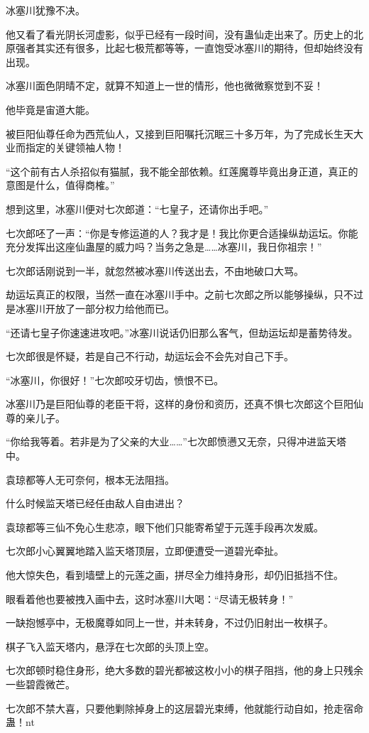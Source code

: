 \begin{this_body}
冰塞川犹豫不决。

他又看了看光阴长河虚影，似乎已经有一段时间，没有蛊仙走出来了。历史上的北原强者其实还有很多，比起七极荒都等等，一直饱受冰塞川的期待，但却始终没有出现。

冰塞川面色阴晴不定，就算不知道上一世的情形，他也微微察觉到不妥！

他毕竟是宙道大能。

被巨阳仙尊任命为西荒仙人，又接到巨阳嘱托沉眠三十多万年，为了完成长生天大业而指定的关键领袖人物！

“这个前有古人杀招似有猫腻，我不能全部依赖。红莲魔尊毕竟出身正道，真正的意图是什么，值得商榷。”

想到这里，冰塞川便对七次郎道：“七皇子，还请你出手吧。”

七次郎呸了一声：“你是专修运道的人？我才是！我比你更合适操纵劫运坛。你能充分发挥出这座仙蛊屋的威力吗？当务之急是……冰塞川，我日你祖宗！”

七次郎话刚说到一半，就忽然被冰塞川传送出去，不由地破口大骂。

劫运坛真正的权限，当然一直在冰塞川手中。之前七次郎之所以能够操纵，只不过是冰塞川开放了一部分权力给他而已。

“还请七皇子你速速进攻吧。”冰塞川说话仍旧那么客气，但劫运坛却是蓄势待发。

七次郎很是怀疑，若是自己不行动，劫运坛会不会先对自己下手。

“冰塞川，你很好！”七次郎咬牙切齿，愤恨不已。

冰塞川乃是巨阳仙尊的老臣干将，这样的身份和资历，还真不惧七次郎这个巨阳仙尊的亲儿子。

“你给我等着。若非是为了父亲的大业……”七次郎愤懑又无奈，只得冲进监天塔中。

袁琼都等人无可奈何，根本无法阻挡。

什么时候监天塔已经任由敌人自由进出？

袁琼都等三仙不免心生悲凉，眼下他们只能寄希望于元莲手段再次发威。

七次郎小心翼翼地踏入监天塔顶层，立即便遭受一道碧光牵扯。

他大惊失色，看到墙壁上的元莲之画，拼尽全力维持身形，却仍旧抵挡不住。

眼看着他也要被拽入画中去，这时冰塞川大喝：“尽请无极转身！”

一缺抱憾亭中，无极魔尊如同上一世，并未转身，不过仍旧射出一枚棋子。

棋子飞入监天塔内，悬浮在七次郎的头顶上空。

七次郎顿时稳住身形，绝大多数的碧光都被这枚小小的棋子阻挡，他的身上只残余一些碧霞微芒。

七次郎不禁大喜，只要他剿除掉身上的这层碧光束缚，他就能行动自如，抢走宿命蛊！nt

\end{this_body}

